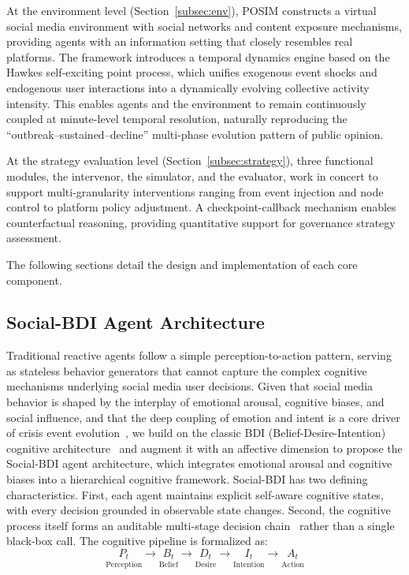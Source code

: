 \documentclass[a4paper,fleqn]{cas-dc}
\begin{document}
At the environment level (Section~\ref{subsec:env}), POSIM constructs a virtual social media environment with social networks and content exposure mechanisms, providing agents with an information setting that closely resembles real platforms. The framework introduces a temporal dynamics engine based on the Hawkes self-exciting point process, which unifies exogenous event shocks and endogenous user interactions into a dynamically evolving collective activity intensity. This enables agents and the environment to remain continuously coupled at minute-level temporal resolution, naturally reproducing the ``outbreak--sustained--decline'' multi-phase evolution pattern of public opinion.

At the strategy evaluation level (Section~\ref{subsec:strategy}), three functional modules, the intervenor, the simulator, and the evaluator, work in concert to support multi-granularity interventions ranging from event injection and node control to platform policy adjustment. A checkpoint-callback mechanism enables counterfactual reasoning, providing quantitative support for governance strategy assessment.

The following sections detail the design and implementation of each core component.


\subsection{Social-BDI Agent Architecture}\label{subsec:agent}

Traditional reactive agents follow a simple perception-to-action pattern, serving as stateless behavior generators that cannot capture the complex cognitive mechanisms underlying social media user decisions. Given that social media behavior is shaped by the interplay of emotional arousal, cognitive biases, and social influence, and that the deep coupling of emotion and intent is a core driver of crisis event evolution~\citep{myint2024crisis_mtl_intent}, we build on the classic BDI (Belief-Desire-Intention) cognitive architecture~\citep{bratman_intention_1987,rao_bdi_1995} and augment it with an affective dimension to propose the Social-BDI agent architecture, which integrates emotional arousal and cognitive biases into a hierarchical cognitive framework. Social-BDI has two defining characteristics. First, each agent maintains explicit self-aware cognitive states, with every decision grounded in observable state changes. Second, the cognitive process itself forms an auditable multi-stage decision chain~\citep{wei_chain_2022} rather than a single black-box call. The cognitive pipeline is formalized as:
\begin{equation}
\underset{\text{Perception}}{P_t} \longrightarrow \underset{\text{Belief}}{B_t} \longrightarrow \underset{\text{Desire}}{D_t} \longrightarrow \underset{\text{Intention}}{I_t} \longrightarrow \underset{\text{Action}}{A_t}
\end{equation}
\end{document}
